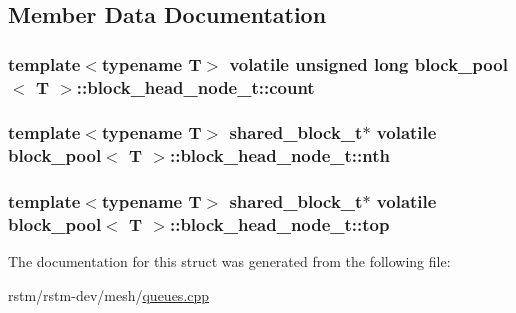 \subsection{Member Data Documentation}
\hypertarget{structblock__pool_1_1block__head__node__t_ae3c6e1b84fef78f3bb4ed7dafd4d2e87}{
\subsubsection[{count}]{\setlength{\rightskip}{0pt plus 5cm}template$<$typename T$>$ volatile unsigned long {\bf block\-\_\-pool}$<$ T $>$\-::block\-\_\-head\-\_\-node\-\_\-t\-::count}}\label{structblock__pool_1_1block__head__node__t_ae3c6e1b84fef78f3bb4ed7dafd4d2e87}
\hypertarget{structblock__pool_1_1block__head__node__t_a94ef0e4bb8ab14ab22b072930932dfce}{
\subsubsection[{nth}]{\setlength{\rightskip}{0pt plus 5cm}template$<$typename T$>$ {\bf shared\-\_\-block\-\_\-t}$\ast$ volatile {\bf block\-\_\-pool}$<$ T $>$\-::block\-\_\-head\-\_\-node\-\_\-t\-::nth}}\label{structblock__pool_1_1block__head__node__t_a94ef0e4bb8ab14ab22b072930932dfce}
\hypertarget{structblock__pool_1_1block__head__node__t_a0b7d249e7dd99ce8039e75200e938c47}{
\subsubsection[{top}]{\setlength{\rightskip}{0pt plus 5cm}template$<$typename T$>$ {\bf shared\-\_\-block\-\_\-t}$\ast$ volatile {\bf block\-\_\-pool}$<$ T $>$\-::block\-\_\-head\-\_\-node\-\_\-t\-::top}}\label{structblock__pool_1_1block__head__node__t_a0b7d249e7dd99ce8039e75200e938c47}


The documentation for this struct was generated from the following file\-:\begin{DoxyCompactItemize}
\item 
rstm/rstm-\/dev/mesh/\hyperlink{queues_8cpp}{queues.\-cpp}\end{DoxyCompactItemize}
